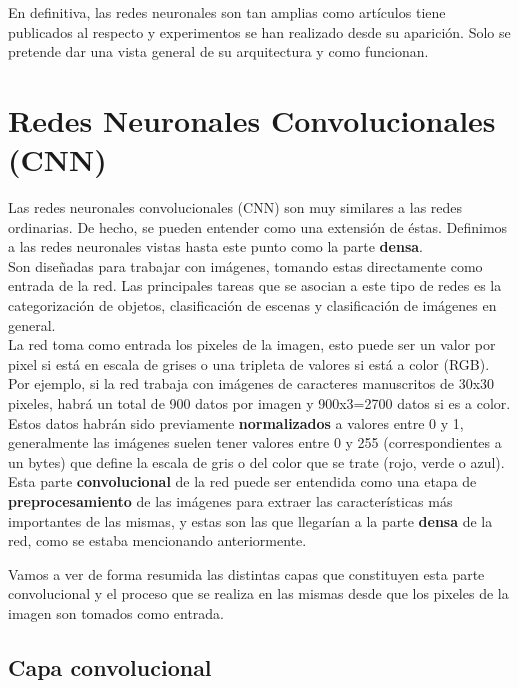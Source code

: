 \documentclass[11pt,fleqn]{book} %
\begin{document}
En definitiva, las redes neuronales son tan amplias como artículos tiene publicados al respecto y experimentos se han realizado desde su aparición. Solo se pretende dar una vista general de su arquitectura y como funcionan. 

\section{Redes Neuronales Convolucionales (CNN)}\label{sec:convolucional}

Las redes neuronales convolucionales (CNN) son muy similares a las redes ordinarias. De hecho, se pueden entender como una extensión de éstas. Definimos a las redes neuronales vistas hasta este punto como la parte \textbf{densa}. \\

Son diseñadas para trabajar con imágenes, tomando estas directamente como entrada de la red. Las principales tareas que se asocian a este tipo de redes es la categorización de objetos, clasificación de escenas y clasificación de imágenes en general. \\

La red toma como entrada los pixeles de la imagen, esto puede ser un valor por pixel si está en escala de grises o una tripleta de valores si está a color (RGB). Por ejemplo, si la red trabaja con imágenes de caracteres manuscritos de 30x30 pixeles, habrá un total de 900 datos por imagen y 900x3=2700 datos si es a color. \\

Estos datos habrán sido previamente \textbf{normalizados} a valores entre 0 y 1, generalmente las imágenes suelen tener valores entre 0 y 255 (correspondientes a un bytes) que define la escala de gris o del color que se trate (rojo, verde o azul). \\

Esta parte \textbf{convolucional} de la red puede ser entendida como una etapa de \textbf{preprocesamiento} de las imágenes para extraer las características más importantes de las mismas, y estas son las que llegarían a la parte \textbf{densa} de la red, como se estaba mencionando anteriormente.

Vamos a ver de forma resumida las distintas capas que constituyen esta parte convolucional y el proceso que se realiza en las mismas desde que los pixeles de la imagen son tomados como entrada.

\subsection{Capa convolucional}\label{sec:convolucional2}
\end{document}
